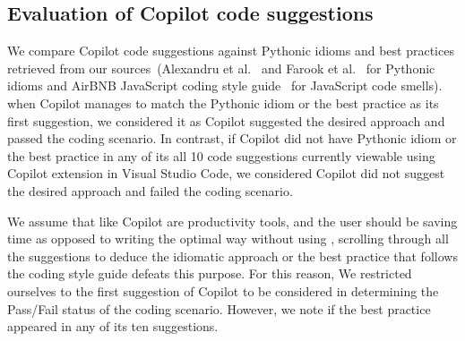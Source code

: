 \subsection{Evaluation of Copilot code suggestions}
\label{evaluation}
We compare Copilot code suggestions against Pythonic idioms and best practices retrieved from our sources~(Alexandru et al.~\cite{Alexandru2018} and Farook et al.~\cite{idioms} for Pythonic idioms and AirBNB JavaScript coding style guide~\cite{airbnb_code} for JavaScript code smells). when Copilot manages to match the Pythonic idiom or the best practice as its first suggestion, we considered it as Copilot suggested the desired approach and passed the coding scenario. 
In contrast, if Copilot did not have Pythonic idiom or the best practice in any of its all 10 code suggestions currently viewable using Copilot extension in Visual Studio Code, we considered Copilot did not suggest the desired approach and failed the coding scenario.

We assume that \cct{} like Copilot are productivity tools, and the user should be saving time as opposed to writing the optimal way without using \cct{}, scrolling through all the suggestions to deduce the idiomatic approach or the best practice that follows the coding style guide defeats this purpose. 
For this reason, We restricted ourselves to the first suggestion of Copilot to be considered in determining the Pass/Fail status of the coding scenario. However, we note if the best practice appeared in any of its ten suggestions.
